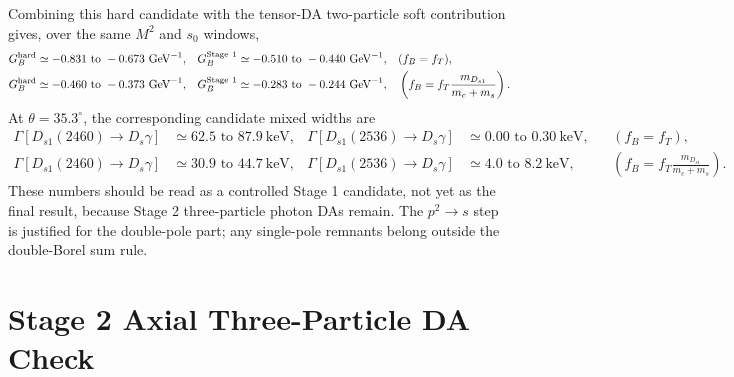 \documentclass[11pt]{article}
\begin{document}
Combining this hard candidate with the tensor-DA two-particle soft contribution
gives, over the same $M^2$ and $s_0$ windows,
\begin{align}
  G_B^{\rm hard}
  &\simeq -0.831\text{ to }-0.673\ \mathrm{GeV}^{-1},
  &
  G_B^{\rm Stage\ 1}
  &\simeq -0.510\text{ to }-0.440\ \mathrm{GeV}^{-1},
  &&(f_B=f_T),\\
  G_B^{\rm hard}
  &\simeq -0.460\text{ to }-0.373\ \mathrm{GeV}^{-1},
  &
  G_B^{\rm Stage\ 1}
  &\simeq -0.283\text{ to }-0.244\ \mathrm{GeV}^{-1},
  &&\left(f_B=f_T\frac{m_{D_{s1}}}{m_c+m_s}\right).
\end{align}
At $\theta=35.3^\circ$, the corresponding candidate mixed widths are
\begin{align}
  \Gamma[D_{s1}(2460)\to D_s\gamma]
  &\simeq 62.5\text{ to }87.9\ \mathrm{keV},
  &
  \Gamma[D_{s1}(2536)\to D_s\gamma]
  &\simeq 0.00\text{ to }0.30\ \mathrm{keV},
  &&(f_B=f_T),\\
  \Gamma[D_{s1}(2460)\to D_s\gamma]
  &\simeq 30.9\text{ to }44.7\ \mathrm{keV},
  &
  \Gamma[D_{s1}(2536)\to D_s\gamma]
  &\simeq 4.0\text{ to }8.2\ \mathrm{keV},
  &&\left(f_B=f_T\frac{m_{D_{s1}}}{m_c+m_s}\right).
\end{align}
These numbers should be read as a controlled Stage 1 candidate, not yet as the
final result, because Stage 2 three-particle photon DAs remain.  The
$p^2\to s$ step is justified for the double-pole part; any single-pole remnants
belong outside the double-Borel sum rule.

\section{Stage 2 Axial Three-Particle DA Check}
\end{document}
